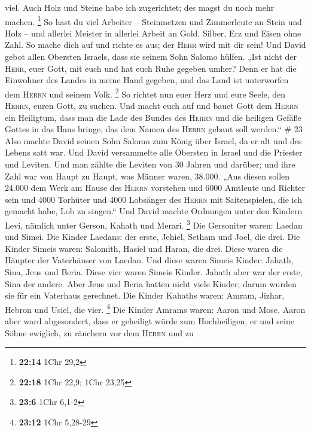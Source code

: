 viel. Auch Holz und Steine habe ich zugerichtet; des magst du noch mehr
machen. \footnote{\textbf{22:14} 1Chr 29,2}  So hast du
viel Arbeiter -- Steinmetzen und Zimmerleute an Stein und Holz -- und
allerlei Meister in allerlei Arbeit  an Gold, Silber, Erz
und Eisen ohne Zahl. So mache dich auf und richte es aus; der
\textsc{Herr} wird mit dir sein!  Und David gebot allen
Obersten Israels, dass sie seinem Sohn Salomo hülfen. 
„Ist nicht der \textsc{Herr}, euer Gott, mit euch und hat euch Ruhe
gegeben umher? Denn er hat die Einwohner des Landes in meine Hand
gegeben, und das Land ist unterworfen dem \textsc{Herrn} und seinem
Volk. \footnote{\textbf{22:18} 1Chr 22,9; 1Chr 23,25}  So
richtet nun euer Herz und eure Seele, den \textsc{Herrn}, euren Gott, zu
suchen. Und macht euch auf und bauet Gott dem \textsc{Herrn} ein
Heiligtum, dass man die Lade des Bundes des \textsc{Herrn} und die
heiligen Gefäße Gottes in das Haus bringe, das dem Namen des
\textsc{Herrn} gebaut soll werden.`` \# 23  Also machte
David seinen Sohn Salomo zum König über Israel, da er alt und des Lebens
satt war.  Und David versammelte alle Obersten in Israel
und die Priester und Leviten.  Und man zählte die Leviten
von 30 Jahren und darüber; und ihre Zahl war von Haupt zu Haupt, was
Männer waren, 38.000.  „Aus diesen sollen 24.000 dem Werk
am Hause des \textsc{Herrn} vorstehen und 6000 Amtleute und Richter sein
 und 4000 Torhüter und 4000 Lobsänger des \textsc{Herrn}
mit Saitenspielen, die ich gemacht habe, Lob zu singen.`` 
Und David machte Ordnungen unter den Kindern Levi, nämlich unter Gerson,
Kahath und Merari. \footnote{\textbf{23:6} 1Chr 6,1-2} 
Die Gersoniter waren: Laedan und Simei.  Die Kinder
Laedans: der erste, Jehiel, Setham und Joel, die drei. 
Die Kinder Simeis waren: Salomith, Hasiel und Haran, die drei. Diese
waren die Häupter der Vaterhäuser von Laedan.  Und diese
waren Simeis Kinder: Jahath, Sina, Jeus und Beria. Diese vier waren
Simeis Kinder.  Jahath aber war der erste, Sina der
andere. Aber Jeus und Beria hatten nicht viele Kinder; darum wurden sie
für ein Vaterhaus gerechnet.  Die Kinder Kahaths waren:
Amram, Jizhar, Hebron und Usiel, die vier. \footnote{\textbf{23:12} 1Chr
  5,28-29}  Die Kinder Amrams waren: Aaron und Mose.
Aaron aber ward abgesondert, dass er geheiligt würde zum Hochheiligen,
er und seine Söhne ewiglich, zu räuchern vor dem \textsc{Herrn} und zu
